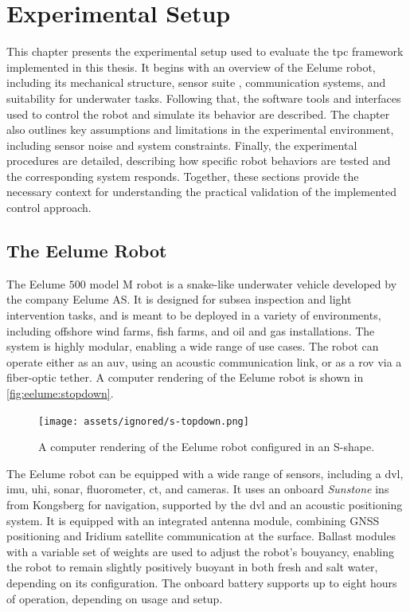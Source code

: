 \chapter{Experimental Setup}
\label{ch:experimental_setup}

This chapter presents the experimental setup used to evaluate the 
\gls{tpc} framework implemented in this thesis. It begins with an 
overview of the Eelume robot, including its mechanical structure, sensor suite
, communication systems, and suitability for underwater tasks. 
Following that, the software tools and interfaces used to control the robot 
and simulate its behavior are described. The chapter also outlines key 
assumptions and limitations in the experimental environment, including sensor 
noise and system constraints. 
Finally, the experimental procedures are detailed, describing how specific 
robot behaviors are tested and the corresponding system responds.
Together, these sections provide the necessary context 
for understanding the practical validation of the implemented control approach.

\section{The Eelume Robot}

The Eelume \(500\) model M robot is a snake-like underwater vehicle developed by 
the company Eelume AS. It is designed for subsea inspection and light 
intervention tasks, and is meant to be deployed in a variety of environments, 
including offshore wind farms, fish farms, and oil and gas installations. The 
system is highly modular, enabling a wide range of use cases.
The robot can operate either as an \gls{auv}, using an acoustic communication 
link, or as a \gls{rov} via a fiber-optic tether. A computer rendering of the 
Eelume robot is shown in \autoref{fig:eelume:stopdown}.

\begin{figure}[h!]
    \centering
    \texttt{[image: assets/ignored/s-topdown.png]}
    \caption{A computer rendering of the Eelume robot configured in an S-shape.}
    \label{fig:eelume:stopdown}
\end{figure}

The Eelume robot can be equipped with a wide range of sensors, including a \gls{dvl},
\gls{imu}, \gls{uhi}, sonar, fluorometer, \gls{ct}, and 
cameras. It uses an onboard \textit{Sunstone} \gls{ins} from Kongsberg for navigation, supported by the \gls{dvl}
and an acoustic positioning system.
It is equipped with an integrated antenna module, combining GNSS positioning and Iridium satellite communication at the surface.
Ballast modules with a variable set of weights are used to adjust the robot's bouyancy,
enabling the robot to remain slightly 
positively buoyant in both fresh and salt water, depending on its configuration.
The onboard battery supports up to eight hours of operation, depending on 
usage and setup.

